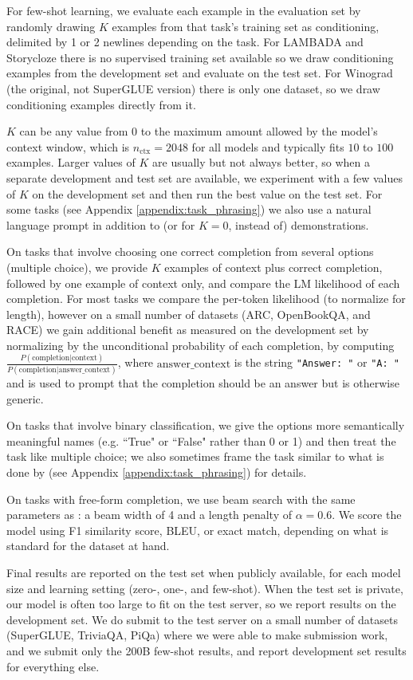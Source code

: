 For few-shot learning, we evaluate each example in the evaluation set by randomly drawing $K$ examples from that task’s training set as conditioning, delimited by 1 or 2 newlines depending on the task.  For LAMBADA and Storycloze there is no supervised training set available so we draw conditioning examples from the development set and evaluate on the test set.  For Winograd (the original, not SuperGLUE version) there is only one dataset, so we draw conditioning examples directly from it.

$K$ can be any value from 0 to the maximum amount allowed by the model’s context window, which is $n_{\mathrm{ctx}}=2048$ for all models and typically fits $10$ to $100$ examples.  Larger values of $K$ are usually but not always better, so when a separate development and test set are available, we experiment with a few values of $K$ on the development set and then run the best value on the test set.  For some tasks (see Appendix \ref{appendix:task_phrasing}) we also use a natural language prompt in addition to (or for $K=0$, instead of) demonstrations.

On tasks that involve choosing one correct completion from several options (multiple choice), we provide $K$ examples of context plus correct completion, followed by one example of context only, and compare the LM likelihood of each completion.  For most tasks we compare the per-token likelihood (to normalize for length), however on a small number of datasets (ARC, OpenBookQA, and RACE) we gain additional benefit as measured on the development set by normalizing by the unconditional probability of each completion, by computing $\frac{P(\mathrm{completion} | \mathrm{context})}{P(\mathrm{completion} | \mathrm{answer\_context})}$, where $\mathrm{answer\_context}$ is the string \texttt{"Answer: "} or \texttt{"A: "} and is used to prompt that the completion should be an answer but is otherwise generic.

On tasks that involve binary classification, we give the options more semantically meaningful names (e.g. ``True" or ``False" rather than 0 or 1) and then treat the task like multiple choice; we also sometimes frame the task similar to what is done by \cite{raffel2019t5} (see Appendix \ref{appendix:task_phrasing}) for details.

On tasks with free-form completion, we use beam search with the same parameters as \cite{raffel2019t5}: a beam width of 4 and a length penalty of $\alpha = 0.6$.  We score the model using F1 similarity score, BLEU, or exact match, depending on what is standard for the dataset at hand.

Final results are reported on the test set when publicly available, for each model size and learning setting (zero-, one-, and few-shot).  When the test set is private, our model is often too large to fit on the test server, so we report results on the development set.  We do submit to the test server on a small number of datasets (SuperGLUE, TriviaQA, PiQa) where we were able to make submission work, and we submit only the 200B few-shot results, and report development set results for everything else. 
